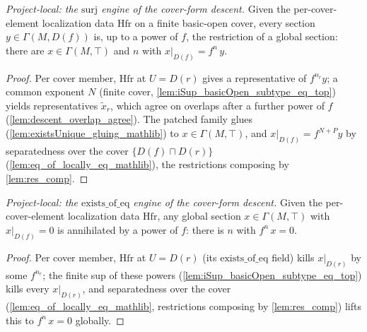 \begin{lemma}

  \label{lem:descent_surj}
  \textit{Project-local: the \(\mathrm{surj}\) engine of the cover-form descent.}
  Given the per-cover-element localization data \(\mathrm{Hfr}\) on a finite basic-open cover, every
  section \(y \in \Gamma(M, D(f))\) is, up to a power of \(f\), the restriction of a global section: there
  are \(x \in \Gamma(M, \top)\) and \(n\) with \(x|_{D(f)} = f^n\, y\).
\end{lemma}
\begin{proof}
  Per cover member, \(\mathrm{Hfr}\) at \(U = D(r)\) gives a representative of \(f^{n_r} y\); a common
  exponent \(N\) (finite cover, \cref{lem:iSup_basicOpen_subtype_eq_top}) yields representatives
  \(\tilde x_r\), which agree on overlaps after a further power of \(f\)
  (\cref{lem:descent_overlap_agree}). The patched family glues
  (\cref{lem:existsUnique_gluing_mathlib}) to \(x \in \Gamma(M, \top)\), and \(x|_{D(f)} = f^{N+P} y\) by
  separatedness over the cover \(\{D(f)\sqcap D(r)\}\) (\cref{lem:eq_of_locally_eq_mathlib}), the
  restrictions composing by \cref{lem:res_comp}.
\end{proof}

\begin{lemma}

  \label{lem:descent_smul_eq_zero}
  \textit{Project-local: the \(\mathrm{exists\_of\_eq}\) engine of the cover-form descent.}
  Given the per-cover-element localization data \(\mathrm{Hfr}\), any global section
  \(x \in \Gamma(M, \top)\) with \(x|_{D(f)} = 0\) is annihilated by a power of \(f\): there is \(n\) with
  \(f^n\, x = 0\).
\end{lemma}
\begin{proof}
  Per cover member, \(\mathrm{Hfr}\) at \(U = D(r)\) (its \(\mathrm{exists\_of\_eq}\) field) kills
  \(x|_{D(r)}\) by some \(f^{n_r}\); the finite sup of these powers
  (\cref{lem:iSup_basicOpen_subtype_eq_top}) kills every \(x|_{D(r)}\), and separatedness over the cover
  (\cref{lem:eq_of_locally_eq_mathlib}, restrictions composing by \cref{lem:res_comp}) lifts this to
  \(f^n\, x = 0\) globally.
\end{proof}

